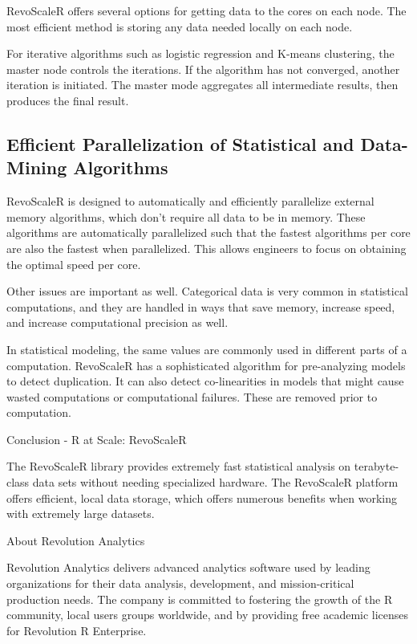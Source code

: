 RevoScaleR offers several options for getting data to the cores on each node. The most efficient method is storing any data needed locally on each node.

For iterative algorithms such as logistic regression and K-means clustering, the master node controls the iterations. If the algorithm has not converged, another iteration is initiated. The master mode aggregates all intermediate results, then produces the final result.

\subsection*{Efficient Parallelization of Statistical and Data-Mining Algorithms}

RevoScaleR is designed to automatically and efficiently parallelize external memory algorithms, which don't require all data to be in memory. These algorithms are automatically parallelized such that the fastest algorithms per core are also the fastest when parallelized. This allows engineers to focus on obtaining the optimal speed per core.

Other issues are important as well. Categorical data is very common in statistical computations, and they are handled in ways that save memory, increase speed, and increase computational precision as well.

In statistical modeling, the same values are commonly used in different parts of a computation. RevoScaleR has a sophisticated algorithm for pre-analyzing models to detect duplication. It can also detect co-linearities in models that might cause wasted computations or computational failures. These are removed prior to computation.

Conclusion - R at Scale: RevoScaleR

The RevoScaleR library provides extremely fast statistical analysis on terabyte-class data sets without needing specialized hardware. The RevoScaleR platform offers efficient, local data storage, which offers numerous benefits when working with extremely large datasets.

About Revolution Analytics

Revolution Analytics delivers advanced analytics software used by leading organizations for their data analysis, development, and mission-critical production needs. The company is committed to fostering the growth of the R community, local users groups worldwide, and by providing free academic licenses for Revolution R Enterprise.

 
